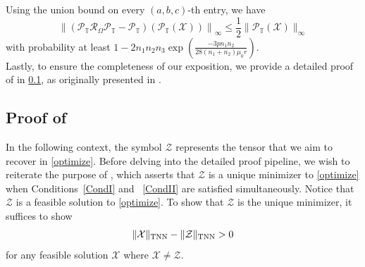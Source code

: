 \documentclass[twoside,12pt]{article}
\newcommand{\TNN}{\textnormal{TNN}}
\begin{document}
Using the union bound on every $(a,b,c)$-th entry, we have 
$$
\left\|\left(\mathcal{P}_{\mathbb{T}} \mathcal{R}_{\Omega} \mathcal{P}_{\mathbb{T}}-\mathcal{P}_{\mathbb{T}}\right)(\mathcal{P}_{\mathbb{T}}(\mathcal{X}))\right\|_{\infty} \leq \frac{1}{2}\|\mathcal{P}_{\mathbb{T}}(\mathcal{X})\|_{\infty}
$$
 with probability at least $1-2n_{1}n_{2}n_{3}\exp\left(\frac{-3pn_{1}n_{2}}{28(n_1+n_2)\mu_{0}r}\right)$.
\hfill\BlackBox\\[2mm]

Lastly, to ensure the completeness of our exposition, we provide a detailed proof of  in \ref{proposition1}, as originally presented in \cite{Lu18}.%


\subsection{Proof of }\label{proposition1}
 In the following context, the symbol $\mathcal{Z}$  represents the tensor that we aim to recover in \eqref{optimize}. Before delving into the detailed proof pipeline, we wish to reiterate the purpose of , which asserts that $\mathcal{Z}$ is a unique minimizer to  \eqref{optimize} when Conditions~\ref{CondI} and ~\ref{CondII} are satisfied simultaneously.
Notice that $\mathcal{Z}$ is a feasible solution to  \eqref{optimize}. To show  that $\mathcal{Z}$ is the unique minimizer, it suffices to show \[\|\mathcal{X}\|_{\TNN}-\|\mathcal{Z}\|_{\TNN} > 0\] for any feasible solution $\mathcal{X}$ where $\mathcal{X}\neq \mathcal{Z}$. 
\end{document}
